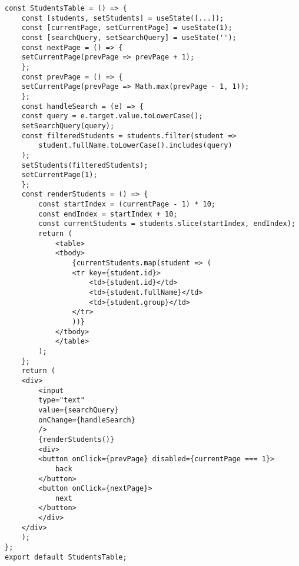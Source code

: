 \documentclass{article}
\begin{document}
\begin{lstlisting}[frame=single, basicstyle=\ttfamily, breaklines=true, breakatwhitespace=true, postbreak=\mbox{\textcolor{red}{$\hookrightarrow$}\space}]
const StudentsTable = () => {
    const [students, setStudents] = useState([...]);
    const [currentPage, setCurrentPage] = useState(1);
    const [searchQuery, setSearchQuery] = useState('');
    const nextPage = () => {
    setCurrentPage(prevPage => prevPage + 1);
    };
    const prevPage = () => {
    setCurrentPage(prevPage => Math.max(prevPage - 1, 1));
    };
    const handleSearch = (e) => {
    const query = e.target.value.toLowerCase();
    setSearchQuery(query);
    const filteredStudents = students.filter(student =>
        student.fullName.toLowerCase().includes(query)
    );
    setStudents(filteredStudents);
    setCurrentPage(1);
    };
    const renderStudents = () => {
        const startIndex = (currentPage - 1) * 10;
        const endIndex = startIndex + 10;
        const currentStudents = students.slice(startIndex, endIndex);
        return (
            <table>
            <tbody>
                {currentStudents.map(student => (
                <tr key={student.id}>
                    <td>{student.id}</td>
                    <td>{student.fullName}</td>
                    <td>{student.group}</td>
                </tr>
                ))}
            </tbody>
            </table>
        );
    };
    return (
    <div>
        <input
        type="text"
        value={searchQuery}
        onChange={handleSearch}
        />
        {renderStudents()}
        <div>
        <button onClick={prevPage} disabled={currentPage === 1}>
            back
        </button>
        <button onClick={nextPage}>
            next
        </button>
        </div>
    </div>
    );
};
export default StudentsTable;
\end{lstlisting}
\end{document}
